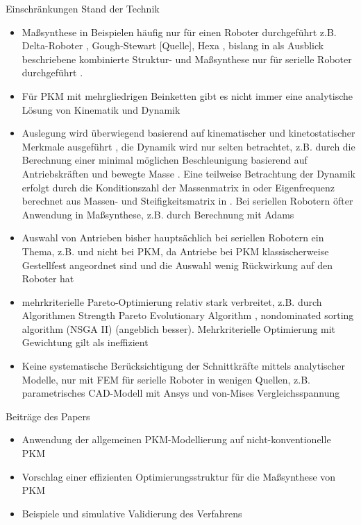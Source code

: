 \documentclass[fleqn,a4paper,10pt]{article}
\begin{document}
\begin{multicols}{2}
%

Einschränkungen Stand der Technik
\begin{itemize}
\item Maßsynthese in Beispielen häufig nur für einen Roboter durchgeführt z.B. Delta-Roboter \cite{KelaiaiaComZaa2012}, Gough-Stewart [Quelle], Hexa \cite{Krefft2006}, bislang in \cite{Krefft2006} als Ausblick beschriebene kombinierte Struktur- und Maßsynthese nur für serielle Roboter durchgeführt \cite{Ramirez2018}.
\item Für PKM mit mehrgliedrigen Beinketten gibt es nicht immer eine analytische Lösung von Kinematik und Dynamik
\item Auslegung wird überwiegend basierend auf kinematischer und kinetostatischer Merkmale ausgeführt \cite{CarboneOttCec2007}, die Dynamik wird nur selten betrachtet, z.B. durch die Berechnung einer minimal möglichen Beschleunigung basierend auf Antriebskräften und bewegte Masse \cite{Krefft2006}.
Eine teilweise Betrachtung der Dynamik erfolgt durch die Konditionszahl der Massenmatrix in \cite{KelaiaiaComZaa2012} oder Eigenfrequenz berechnet aus Massen- und Steifigkeitsmatrix in \cite{JamwalHusXie2015}. Bei seriellen Robotern öfter Anwendung in Maßsynthese, z.B. durch Berechnung mit Adams \cite{ZhouBaiHan2011}
\item Auswahl von Antrieben bisher hauptsächlich bei seriellen Robotern ein Thema, z.B. \cite{ZhouBaiHan2011} und nicht bei PKM, da Antriebe bei PKM klassischerweise Gestellfest angeordnet sind und die Auswahl wenig Rückwirkung auf den Roboter hat
\item mehrkriterielle Pareto-Optimierung relativ stark verbreitet, z.B. durch Algorithmen Strength Pareto Evolutionary Algorithm \cite{Krefft2006,KelaiaiaComZaa2012},  nondominated sorting
algorithm (NSGA II) \cite {JamwalHusXie2015} (angeblich besser). Mehrkriterielle Optimierung mit Gewichtung gilt als ineffizient \cite{JamwalHusXie2015}
\item Keine systematische Berücksichtigung der Schnittkräfte mittels analytischer Modelle, nur mit FEM für serielle Roboter in wenigen Quellen, z.B. parametrisches CAD-Modell mit Ansys \cite{ZhouBai2015} und von-Mises Vergleichsspannung
\end{itemize}

Beiträge des Papers
\begin{itemize}
\item Anwendung der allgemeinen PKM-Modellierung auf nicht-konventionelle PKM
\item Vorschlag einer effizienten Optimierungsstruktur für die Maßsynthese von PKM
\item Beispiele und simulative Validierung des Verfahrens
\end{itemize}


\end{multicols}
\end{document}
